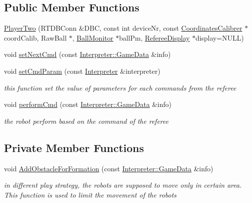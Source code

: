 \subsection*{Public Member Functions}
\begin{DoxyCompactItemize}
\item 
\hyperlink{classPlayerTwo_ac69719e70c78f7dffa36300f833955b1}{PlayerTwo} (RTDBConn \&DBC, const int deviceNr, const \hyperlink{classCoordinatesCalibrer}{CoordinatesCalibrer} $\ast$coordCalib, RawBall $\ast$, \hyperlink{classBallMonitor}{BallMonitor} $\ast$ballPm, \hyperlink{classRefereeDisplay}{RefereeDisplay} $\ast$display=NULL)
\item 
void \hyperlink{classPlayerTwo_a7ac9a9a4f1dedee2006e6a0c79f37c0c}{setNextCmd} (const \hyperlink{structInterpreter_1_1GameData}{Interpreter::GameData} \&info)
\item 
void \hyperlink{classPlayerTwo_aa0294cf24297f66ffd92f1a250794340}{setCmdParam} (const \hyperlink{classInterpreter}{Interpreter} \&interpreter)
\begin{DoxyCompactList}\small\item\em this function set the value of parameters for each commands from the referee \item\end{DoxyCompactList}\item 
void \hyperlink{classPlayerTwo_a56d794b718c60092a324f312b8333eb9}{performCmd} (const \hyperlink{structInterpreter_1_1GameData}{Interpreter::GameData} \&info)
\begin{DoxyCompactList}\small\item\em the robot perform based on the command of the referee \item\end{DoxyCompactList}\end{DoxyCompactItemize}
\subsection*{Private Member Functions}
\begin{DoxyCompactItemize}
\item 
void \hyperlink{classPlayerTwo_a9e3341541658f54a2dfb0491a774b4d4}{AddObstacleForFormation} (const \hyperlink{structInterpreter_1_1GameData}{Interpreter::GameData} \&info)
\begin{DoxyCompactList}\small\item\em in different play strategy, the robots are supposed to move only in certain area. This function is used to limit the movement of the robots \item\end{DoxyCompactList}\end{DoxyCompactItemize}
